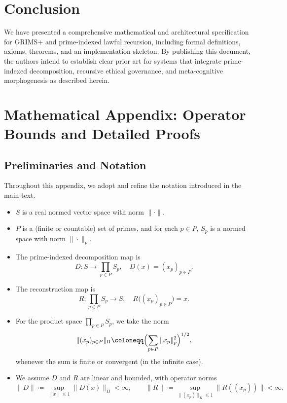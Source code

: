 \documentclass[11pt]{article}
\begin{document}
\section{Conclusion}

We have presented a comprehensive mathematical and architectural specification for GRIMS+ and prime-indexed lawful recursion, including formal definitions, axioms, theorems, and an implementation skeleton.%
By publishing this document, the authors intend to establish clear prior art for systems that integrate prime-indexed decomposition, recursive ethical governance, and meta-cognitive morphogenesis as described herein.

\appendix
\section{Mathematical Appendix: Operator Bounds and Detailed Proofs}

\subsection{Preliminaries and Notation}

Throughout this appendix, we adopt and refine the notation introduced in the main text.

\begin{itemize}
  \item \(S\) is a real normed vector space with norm \(\|\cdot\|\).
  \item \(P\) is a (finite or countable) set of primes, and for each \(p \in P\), \(S_p\) is a normed space with norm \(\|\cdot\|_p\).
  \item The prime-indexed decomposition map is
  \[
    D : S \to \prod_{p \in P} S_p, \quad D(x) = (x_p)_{p \in P}.
  \]
  \item The reconstruction map is
  \[
    R : \prod_{p \in P} S_p \to S, \quad R\bigl((x_p)_{p \in P}\bigr) = x.
  \]
  \item For the product space \(\prod_{p \in P} S_p\), we take the norm
  \[
    \|(x_p)_{p \in P}\|_{\Pi} \coloneqq \Bigl( \sum_{p \in P} \|x_p\|_p^2 \Bigr)^{1/2},
  \]
  whenever the sum is finite or convergent (in the infinite case).
  \item We assume \(D\) and \(R\) are linear and bounded, with operator norms
  \[
    \|D\| \coloneqq \sup_{\|x\| \le 1} \|D(x)\|_{\Pi} < \infty,
    \qquad
    \|R\| \coloneqq \sup_{\|(x_p)\|_{\Pi} \le 1} \|R((x_p))\| < \infty.
  \]
\end{itemize}
\end{document}
